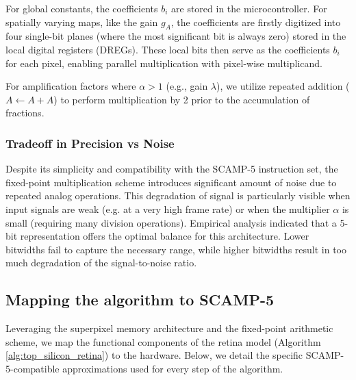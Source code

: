 \documentclass{article}
\begin{document}
For global constants, the coefficients $b_i$ are stored in the microcontroller. For spatially varying maps, like the gain $g_A$, the coefficients are firstly digitized into four single-bit planes (where the most significant bit is always zero) stored in the local digital registers (DREGs). These local bits then serve as the coefficients $b_i$ for each pixel, enabling parallel multiplication with pixel-wise multiplicand.

For amplification factors where $\alpha > 1$ (e.g., gain $\lambda$), we utilize repeated addition ($A \leftarrow A + A$) to perform multiplication by 2 prior to the accumulation of fractions.

\subsubsection*{Tradeoff in Precision vs Noise}

Despite its simplicity and compatibility with the SCAMP-5 instruction set, the fixed-point multiplication scheme introduces significant amount of noise due to repeated analog operations. This degradation of signal is particularly visible when input signals are weak (e.g. at a very high frame rate) or when the multiplier $\alpha$ is small (requiring many division operations). Empirical analysis indicated that a 5-bit representation offers the optimal balance for this architecture. Lower bitwidths fail to capture the necessary range, while higher bitwidths result in too much degradation of the signal-to-noise ratio.

\subsection{Mapping the algorithm to SCAMP-5}
\label{section:mapping}
Leveraging the superpixel memory architecture and the fixed-point arithmetic scheme, we map the functional components of the retina model (Algorithm \ref{alg:top_silicon_retina}) to the hardware. Below, we detail the specific SCAMP-5-compatible approximations used for every step of the algorithm. 
\end{document}
